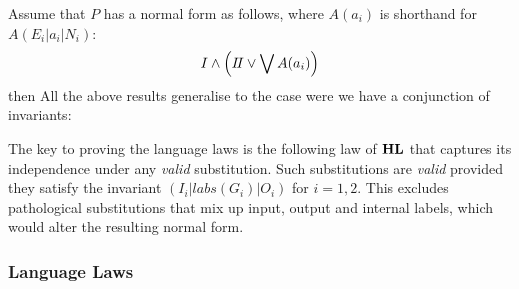 Assume that $P$ has a normal form as follows,
where $A(a_i)$ is shorthand for $A(E_i|a_i|N_i)$:
\[
   I \land \left( I\!I \lor \bigvee A(a_i) \right)
\]
then
All the above results generalise to the case were we have a conjunction
of invariants:


The key to proving the language laws is the following law of $\mathbf{HL}$
that captures its independence under any \emph{valid} substitution.
Such substitutions are \emph{valid} provided they satisfy the invariant
$(I_i | labs(G_i) | O_i)$ for $i=1,2$.
This excludes pathological substitutions that mix up input, output
and internal labels, which would alter the resulting normal form.

\subsubsection{Language Laws}\label{ssec:lang-laws}

